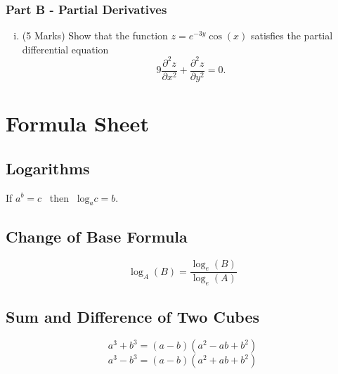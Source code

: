 \documentclass[a4paper,12pt]{article}
\begin{document}
\bigskip
\subsubsection*{Part B - Partial Derivatives}
\begin{enumerate}[(i)]
	
	\item (5 Marks)
	Show that the function $z=e^{-3y}\cos(x)$ satisfies the partial differential equation
	\[ 9\frac{\partial^2 z}{\partial x^2} + \frac{\partial^2 z}{\partial y^2} = 0. \]
\end{enumerate}
%
%	
%
%
%

\newpage
	\section*{Formula Sheet}
	
\subsection*{Logarithms}
If $a^b = c$ \, then \, $\mbox{log}_a c = b$.



\subsection*{Change of Base Formula}

\[ \log_A(B) = \frac{ \log_e(B) }{ \log_e(A) }  \]
	\subsection*{Sum and Difference of Two Cubes}
	\[ a^3 + b^3 = (a-b)(a^2 - ab + b^2)\]
	\[ a^3 - b^3 = (a-b)(a^2 + ab + b^2)\]
	
\end{document}
